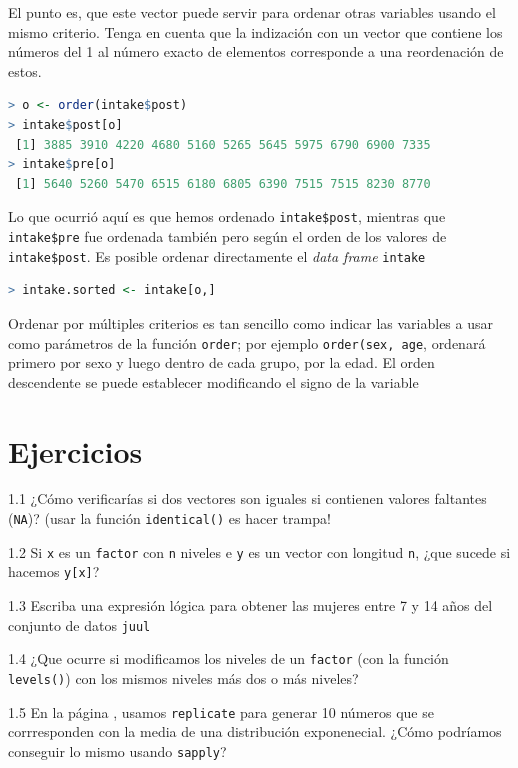 El punto es, que este vector puede servir para ordenar otras variables usando
el mismo criterio. Tenga en cuenta que la indización con un vector que contiene
los números del 1 al número exacto de elementos corresponde a una reordenación
de estos.

\begin{lstlisting}[language=R]
> o <- order(intake$post)
> intake$post[o]
 [1] 3885 3910 4220 4680 5160 5265 5645 5975 6790 6900 7335
> intake$pre[o]
 [1] 5640 5260 5470 6515 6180 6805 6390 7515 7515 8230 8770
\end{lstlisting}


Lo que ocurrió aquí es que hemos ordenado \texttt{intake\$post}, mientras que
\texttt{intake\$pre} fue ordenada también pero según el orden de los valores de
\texttt{intake\$post}. Es posible ordenar directamente el \textit{data frame}
\texttt{intake}

\begin{lstlisting}[language=R]
> intake.sorted <- intake[o,]
\end{lstlisting}

Ordenar por múltiples criterios es tan sencillo como indicar las variables a
usar como parámetros de la función \texttt{order}; por ejemplo
\texttt{order(sex, age}, ordenará primero por sexo y luego dentro de cada
grupo, por la edad. El orden descendente se puede establecer modificando el
signo de la variable

\section{Ejercicios}

1.1 ¿Cómo verificarías si dos vectores son iguales si contienen valores
faltantes (\texttt{NA})? (usar la función \texttt{identical()} es hacer
trampa!

1.2 Si \texttt{x} es un \texttt{factor} con \texttt{n} niveles e \texttt{y} es
un vector con longitud \texttt{n}, ¿que sucede si hacemos \texttt{y[x]}?

1.3 Escriba una expresión lógica para obtener las mujeres entre 7 y 14 años del
conjunto de datos \texttt{juul}

1.4 ¿Que ocurre si modificamos los niveles de un \texttt{factor} (con la
función \texttt{levels()}) con los mismos niveles más dos o más niveles?

1.5 En la página \pageref{ciclosimplicitos}, usamos \texttt{replicate} para
generar 10 números que se corrresponden con la media de una distribución
exponenecial.  ¿Cómo podríamos conseguir lo mismo usando \texttt{sapply}?
